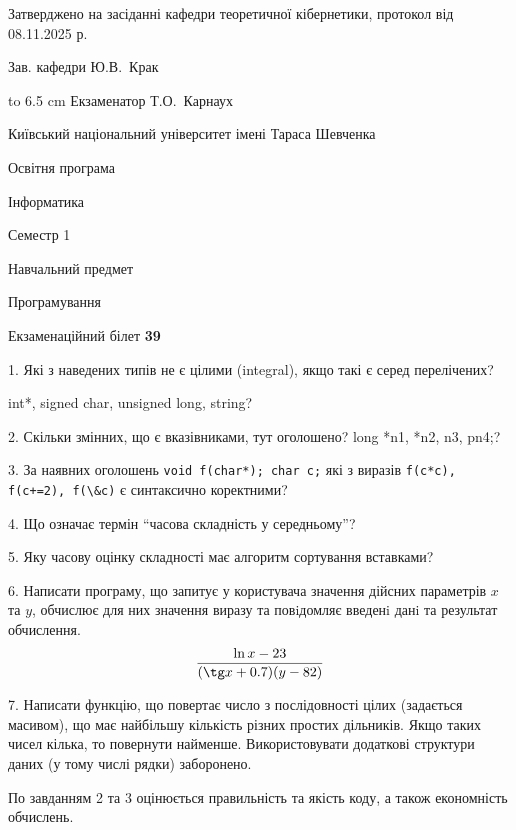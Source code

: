 \documentclass[12pt, ukrainian]{article}
\def\code#1{\Verb!#1!}
\begin{document}
{\smallskip\smallskip \begin {scriptsize} Затверджено на засіданні кафедри теоретичної кібернетики, протокол   від   08.11.2025 р.\par\smallskip\smallskip\smallskip\smallskip
{\parbox {6.5 cm} {Зав. кафедри \dotfill Ю.В.~Крак}}\hspace {0.7cm} {\hbox to 6.5 cm { Екзаменатор \dotfill Т.О.~Карнаух}} \end{scriptsize}}
\newpage
{{\begin {scriptsize}\par
{ \center  Київський національний університет імені Тараса Шевченка \par}
{\parbox {5 cm}{Освітня програма \hfill}{\parbox {7 cm}{Інформатика\hfill}}\parbox {6 cm}{\hfill Семестр 1}}\par
{\parbox {5 cm} {Навчальний предмет \hfill}\parbox {7 cm}{Програмування \hfill}\parbox {6cm}{\hfill}\par}\vspace{-15pt} \end{scriptsize}}{\center Екзаменаційний білет \No \textbf { 39 }\par}}
{%
1. Які з наведених типів не є цілими (integral), якщо такі є серед перелічених?

int*, signed char, unsigned long, string?
\par
\vspace{2mm}
2. Скільки змінних, що є вказівниками, тут оголошено?
long *n1, *n2, n3, pn4;?
\par
\vspace{2mm}
3. За наявних оголошень \code{void f(char*); char c;} які з виразів \code{f(c*c), f(c+=2), f(\&c)} є синтаксично коректними?
\par
\vspace{2mm}
4. Що означає термін ``часова складність у середньому''?
\par
\vspace{2mm}
5. Яку часову оцінку складності має алгоритм сортування вставками?
\par
\vspace{2mm}
6. Написати програму, що запитує у користувача значення дійсних параметрів $x$ та $y$, обчислює для них значення виразу та повiдомляє введенi данi та результат обчислення.
$$\frac{\ln x - 23}{(\tg x + 0.7) (y - 82)}$$ 

\par
7. Написати функцію, що повертає число з послідовності цілих (задається масивом), що має найбільшу кількість різних простих дільників. Якщо таких чисел кілька, то повернути найменше. Використовувати додаткові структури даних (у тому числі рядки) заборонено.

По завданням 2 та 3 оцінюється правильність та якість коду, а також економність обчислень.

}
\end{document}
